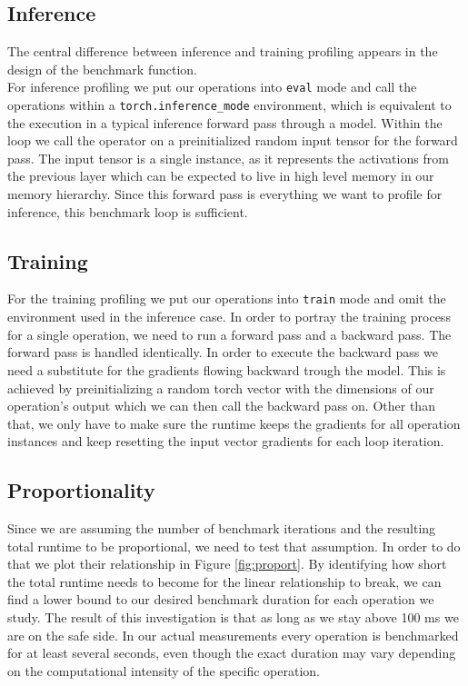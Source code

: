 \subsection{Inference}
The central difference between inference and training profiling appears in the design of the benchmark function. \\
For inference profiling we put our operations into \texttt{eval} mode and call the operations within a \texttt{torch.inference\_mode} environment, which is equivalent to the execution in a typical inference forward pass through a model. Within the loop we call the operator on a preinitialized random input tensor for the forward pass. The input tensor is a single instance, as it represents the activations from the previous layer which can be expected to live in high level memory in our memory hierarchy. Since this forward pass is everything we want to profile for inference, this benchmark loop is sufficient.

\subsection{Training}
For the training profiling we put our operations into \texttt{train} mode and omit the environment used in the inference case. In order to portray the training process for a single operation, we need to run a forward pass and a backward pass. The forward pass is handled identically. In order to execute the backward pass we need a substitute for the gradients flowing backward trough the model. This is achieved by preinitializing a random torch vector with the dimensions of our operation's output which we can then call the backward pass on. Other than that, we only have to make sure the runtime keeps the gradients for all operation instances and keep resetting the input vector gradients for each loop iteration.

\subsection{Proportionality}
Since we are assuming the number of benchmark iterations and the resulting total runtime to be proportional, we need to test that assumption. In order to do that we plot their relationship in Figure \ref{fig:proport}. By identifying how short the total runtime needs to become for the linear relationship to break, we can find a lower bound to our desired benchmark duration for each operation we study. The result of this investigation is that as long as we stay above 100 ms we are on the safe side. In our actual measurements every operation is benchmarked for at least several seconds, even though the exact duration may vary depending on the computational intensity of the specific operation.


